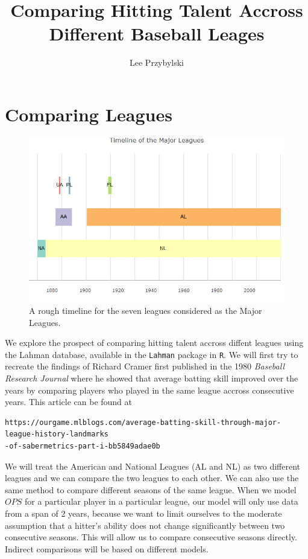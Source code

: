 \documentclass [52pt] {article}
\title{Comparing Hitting Talent Accross Different Baseball Leages}
\author{Lee Przybylski}
\begin{document}
\maketitle

\section{Comparing Leagues}
\begin{figure}[h!]
\centering
\includegraphics[scale = 0.7]{MLBtimeline.png}
\caption{\label{fig : mlbtimeline} A rough timeline for the seven leagues considered as the Major Leagues.}
\end{figure}
\noindent
We explore the prospect of comparing hitting talent accross diffent leagues using the Lahman database, available in the \verb|Lahman| package in \verb|R|.   We will first try to recreate the findings of Richard Cramer first published in the 1980 \emph{Baseball Research Journal} where he showed that average batting skill improved over the years by comparing players who played in the same league accross consecutive years.  This article can be found at
\begin{verbatim}
https://ourgame.mlblogs.com/average-batting-skill-through-major-league-history-landmarks
-of-sabermetrics-part-i-bb5849adae0b
\end{verbatim}
We will treat the American and National Leagues (AL and NL) as two different leagues and we can compare the two leagues to each other.  We can also use the same method to compare different seasons of the same league.  When we model $OPS$ for a particular player in a particular league, our model will only use data from a span of 2 years, because we want to limit ourselves to the moderate assumption that a hitter's ability does not change significantly between two consecutive seasons.  This will allow us to compare consecutive seasons directly.  Indirect comparisons will be based on different models.  
\end{document}
